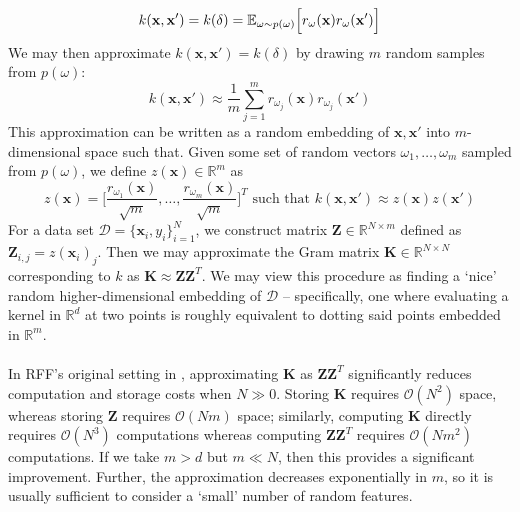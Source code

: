 \documentclass[11pt]{article}
\newcommand{\E}{\mathbb{E}}
\newcommand{\R}{\mathbb{R}}
\begin{document}
$$k(\mathbf{x}, \mathbf{x}') = k(\delta) = \E_{\omega \sim p(\omega)}\Bigl[ r_\omega(\mathbf{x})r_\omega(\mathbf{x}')\Bigr]$$
We may then approximate $k(\mathbf{x}, \mathbf{x}') = k(\delta)$ by drawing $m$ random samples from $p(\omega)$:
$$k(\mathbf{x}, \mathbf{x}') \approx \frac1m \sum_{j = 1}^mr_{\omega_j}(\mathbf{x})r_{\omega_j}(\mathbf{x}')$$
This approximation can be written as a random embedding of $\mathbf{x}, \mathbf{x}'$ into $m$-dimensional space such that. Given some set of random vectors $\omega_1, \dots, \omega_m$ sampled from $p(\omega)$, we define $z(\mathbf{x}) \in \R^m$ as
$$z(\mathbf{x}) = \Biggl[\frac{r_{\omega_1}(\mathbf{x})}{\sqrt{m}}, \dots, \frac{r_{\omega_m}(\mathbf{x})}{\sqrt{m}}\Biggl]^T \text{  such that  } k(\mathbf{x}, \mathbf{x}') \approx z(\mathbf{x})z(\mathbf{x}')$$
For a data set $\mathcal{D} = \{\mathbf{x}_i, y_i\}_{i = 1}^N$, we construct matrix $\mathbf{Z} \in \R^{N \times m}$ defined as $\mathbf{Z}_{i, j} = z(\mathbf{x}_i)_j$. Then we may approximate the Gram matrix $\mathbf{K} \in \R^{N \times N}$ corresponding to $k$ as $\mathbf{K} \approx \mathbf{Z}\mathbf{Z}^T$. We may view this procedure as finding a `nice' random higher-dimensional embedding of $\mathcal{D}$ – specifically, one where evaluating a kernel in $\R^d$ at two points is roughly equivalent to dotting said points embedded in $\R^m$.\\ 
\\
In RFF's original setting in \cite{RFF}, approximating $\mathbf{K}$ as $\mathbf{ZZ}^T$ significantly reduces computation and storage costs when $N \gg 0$. Storing $\mathbf{K}$ requires $\mathcal{O}(N^2)$ space, whereas storing $\mathbf{Z}$ requires $\mathcal{O}(Nm)$ space; similarly, computing $\mathbf{K}$ directly requires $\mathcal{O}(N^3)$ computations whereas computing $\mathbf{ZZ}^T$ requires $\mathcal{O}(Nm^2)$ computations. If we take $m > d$ but $m \ll N$, then this provides a significant improvement. Further, the approximation decreases exponentially in $m$, so it is usually sufficient to consider a `small' number of random features. 
\end{document}
